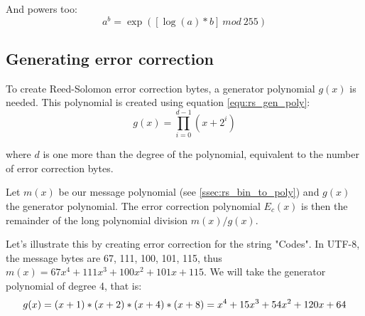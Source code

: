 And powers too: \[
  a^b = \exp([\log(a) * b]\ mod\ 255)
\]

\subsection{Generating error correction}
\label{ssec:rs_gen}
To create Reed-Solomon error correction bytes, a generator polynomial $g(x)$ is needed.
This polynomial is created using equation \ref{equ:rs_gen_poly}:
\begin{equation}
  g(x) = \prod_{i=0}^{d-1} (x + 2^i)
  \label{equ:rs_gen_poly}
\end{equation}

where $d$ is one more than the degree of the polynomial, equivalent to the number of error correction bytes.

Let $m(x)$ be our message polynomial (see \autoref{ssec:rs_bin_to_poly}) and $g(x)$ the generator polynomial. The error correction polynomial $E_c(x)$ is then the remainder of the long polynomial division $m(x)/g(x)$.

Let's illustrate this by creating error correction for the string "Codes". In UTF-8, the message bytes are 67, 111, 100, 101, 115, thus $m(x) = 67x^4+ 111x^3+ 100x^2+ 101x+ 115$.
We will take the generator polynomial of degree 4, that is: \[
  g(x) = (x + 1)*(x + 2)*(x + 4)*(x + 8)\\
  = x^4 + 15x^3 + 54x^2 + 120x + 64
\]

